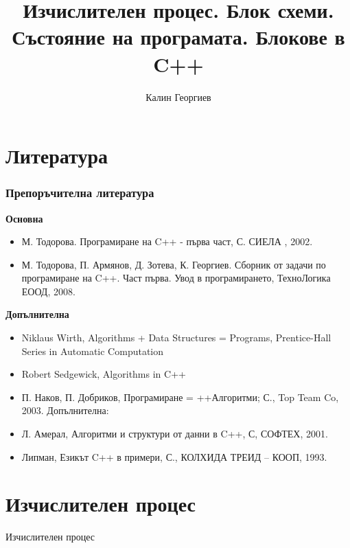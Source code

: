 \documentclass{beamer}
\begin{document}
\title[Увод в програмирането]{Изчислителен процес. Блок схеми. Състояние на програмата. Блокове в C++} 
\author{Калин Георгиев} 
\frame{\titlepage} 


\section{Литература} 



\begin{frame}[fragile]
\frametitle{Препоръчителна литература}


\textbf{Основна}

\begin{itemize}

\item М. Тодорова. Програмиране на C++ - първа част, С. СИЕЛА , 2002.
\item М. Тодорова, П. Армянов, Д. Зотева, К. Георгиев. Сборник от задачи по програмиране на C++. Част първа. Увод в програмирането, ТехноЛогика ЕООД, 2008.

\end{itemize}


\textbf{Допълнителна}


\begin{itemize}

\item  Niklaus Wirth,  Algorithms + Data Structures = Programs, Prentice-Hall Series in Automatic Computation 
\item Robert Sedgewick, Algorithms in C++
\item П. Наков, П. Добриков, Програмиране = ++Алгоритми; С., Top Team Co, 2003.
Допълнителна:
\item Л. Амерал, Алгоритми и структури от данни в C++, С, СОФТЕХ, 2001.
\item Липман, Езикът C++ в примери, С., КОЛХИДА ТРЕИД – КООП, 1993.

\end{itemize}


\end{frame}



\section{Изчислителен процес} 


\begin{frame}
\centerline{Изчислителен процес}
\end{frame}
\end{document}
